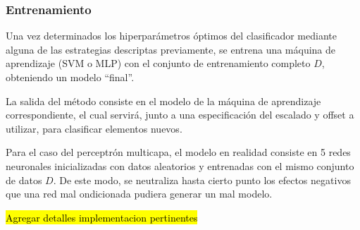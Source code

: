 %
\subsubsection{Entrenamiento}
%
Una vez determinados los hiperparámetros óptimos del clasificador
mediante alguna de las estrategias descriptas previamente, se entrena
una máquina de aprendizaje (SVM o MLP) con el conjunto de
entrenamiento completo $D$, obteniendo un modelo ``final''.

La salida del método consiste en el modelo de la máquina de
aprendizaje correspondiente, el cual servirá, junto a una
especificación del escalado y offset a utilizar, para clasificar
elementos nuevos.

Para el caso del perceptrón multicapa, el modelo en realidad
consiste en 5 redes neuronales inicializadas con datos aleatorios
y entrenadas con el mismo conjunto de datos $D$.
De este modo, se neutraliza hasta cierto punto los efectos negativos
que una red mal ondicionada pudiera generar un mal modelo.

{\Huge \hl{Agregar detalles implementacion pertinentes}}
